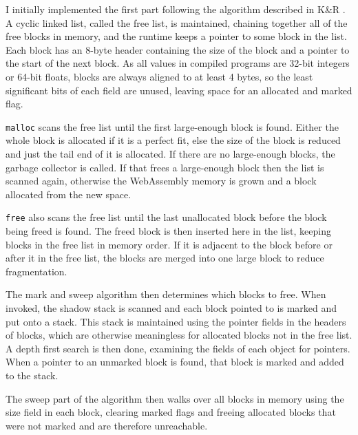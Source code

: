 I initially implemented the first part following the algorithm described in K\&R \cite{k_and_r}. A cyclic linked list, called the free list, is maintained, chaining together all of the free blocks in memory, and the runtime keeps a pointer to some block in the list. Each block has an 8-byte header containing the size of the block and a pointer to the start of the next block. %
As all values in compiled programs are 32-bit integers or 64-bit floats, blocks are always aligned to at least 4 bytes, so the least significant bits of each field are unused, leaving space for an allocated and marked flag. 

\verb|malloc| scans the free list until the first large-enough block is found. Either the whole block is allocated if it is a perfect fit, else the size of the block is reduced and just the tail end of it is allocated. If there are no large-enough blocks, the garbage collector is called. If that frees a large-enough block then the list is scanned again, otherwise the WebAssembly memory is grown and a block allocated from the new space.


\verb|free| also scans the free list until the last unallocated block before the block being freed is found. The freed block is then inserted here in the list, keeping blocks in the free list in memory order. If it is adjacent to the block before or after it in the free list, the blocks are merged into one large block to reduce fragmentation.

The mark and sweep algorithm then determines which blocks to free. When invoked, the shadow stack is scanned and each block pointed to is marked and put onto a stack. This stack is maintained using the pointer fields in the headers of blocks, which are otherwise meaningless for allocated blocks not in the free list. A depth first search is then done, examining the fields of each object for pointers. When a pointer to an unmarked block is found, that block is marked and added to the stack. 

The sweep part of the algorithm then walks over all blocks in memory using the size field in each block, clearing marked flags and freeing allocated blocks that were not marked and are therefore unreachable.

